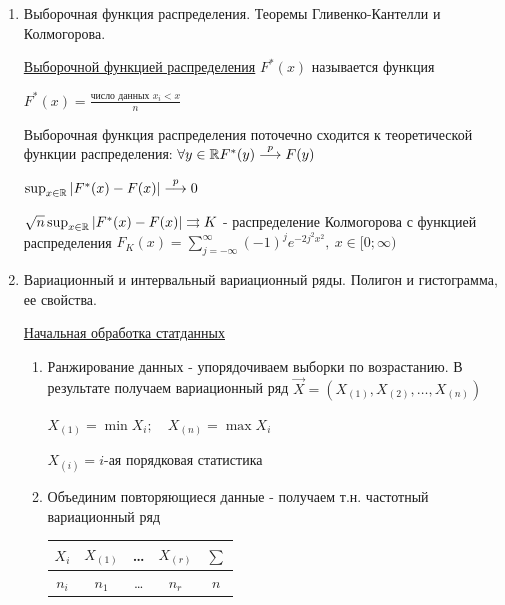 \documentclass[12pt]{article}
\begin{document}
\begin{enumerate}
    \item Выборочная функция распределения. Теоремы Гливенко-Кантелли и Колмогорова.

    \Def \hyperlink{selective_distribution_function}{Выборочной функцией распределения} $F^*(x)$ называется функция 
    
    $F^*(x) = \frac{\text{число данных } x_i < x}{n}$

    \begin{MyTheorem}
        \Ths Выборочная функция распределения поточечно сходится к теоретической функции распределения: 
        $\forall y \in \mathbb{R} F^*(y) \overset{p}{\longrightarrow} F(y)$
    \end{MyTheorem}

    \begin{MyTheorem}
         $\sup_{x \in \mathbb{R}} |F^*(x) - F(x)| \overset{p}{\longrightarrow} 0$
    \end{MyTheorem}

    \begin{MyTheorem}
         $\sqrt{n} \sup_{x \in \mathbb{R}} |F^*(x) - F(x)| \rightrightarrows K$ - распределение Колмогорова с 
        функцией распределения $F_K(x) = \sum_{j = -\infty}^{\infty} (-1)^j e^{-2 j^2 x^2}, \ x \in [0;\infty)$
    \end{MyTheorem}

    \item Вариационный и интервальный вариационный ряды. Полигон и гистограмма, ее свойства.

        
    \hyperlink{initial_data_processing}{Начальная обработка статданных}

    \begin{enumerate}
        \item Ранжирование данных - упорядочиваем выборки по возрастанию. В результате получаем вариационный ряд $\vec{X} = (X_{(1)}, X_{(2)}, \dots, X_{(n)})$

        $X_{(1)} = \min X_i; \quad X_{(n)} = \max X_i$

        $X_{(i)} = i$-ая порядковая статистика

        \item Объединим повторяющиеся данные - получаем т.н. частотный вариационный ряд

        \begin{tabular}{c|c|c|c|c}
            $X_i$ & $X_{(1)}$ & \dots & $X_{(r)}$ & $\sum$ \\ 
            \hline
            $n_i$ & $n_1$ & \dots & $n_r$ & $n$ \\ 
        \end{tabular}


\end{enumerate}
\end{enumerate}
\end{document}

